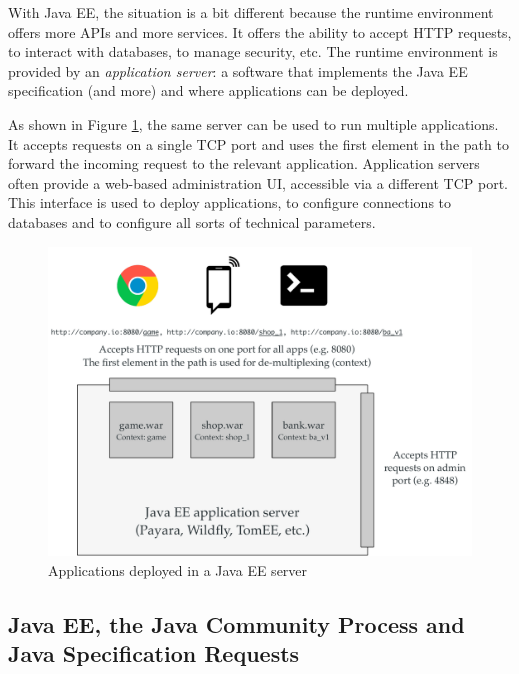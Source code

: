 With Java EE, the situation is a bit different because the runtime environment offers more APIs and more services. It offers the ability to accept HTTP requests, to interact with databases, to manage security, etc. The runtime environment is provided by an \emph{application server}: a software that implements the Java EE specification (and more) and where applications can be deployed.

As shown in Figure \ref{fig:app-server}, the same server can be used to run multiple applications. It accepts requests on a single TCP port and uses the first element in the path to forward the incoming request to the relevant application. Application servers often provide a web-based administration UI, accessible via a different TCP port. This interface is used to deploy applications, to configure connections to databases and to configure all sorts of technical parameters.

\begin{figure}[]
	\centering
    \includegraphics[width=1.0\linewidth]{Figures/app-server.pdf}
	\caption{Applications deployed in a Java EE server}
  \label{fig:app-server}
\end{figure}

\subsection{Java EE, the Java Community Process and Java Specification Requests}


